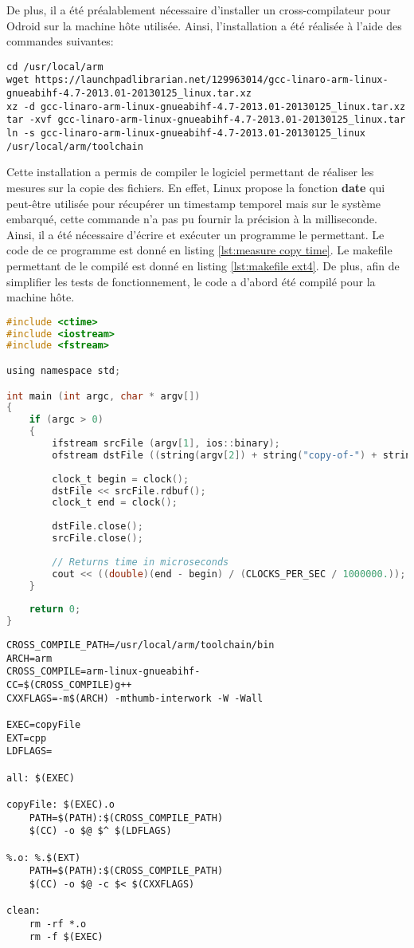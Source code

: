 De plus, il a été préalablement nécessaire d'installer un cross-compilateur pour Odroid sur la machine hôte utilisée. Ainsi, l'installation a été réalisée à l'aide des commandes suivantes:
\begin{lstlisting}[style=Bash]
cd /usr/local/arm
wget https://launchpadlibrarian.net/129963014/gcc-linaro-arm-linux-gnueabihf-4.7-2013.01-20130125_linux.tar.xz
xz -d gcc-linaro-arm-linux-gnueabihf-4.7-2013.01-20130125_linux.tar.xz 
tar -xvf gcc-linaro-arm-linux-gnueabihf-4.7-2013.01-20130125_linux.tar
ln -s gcc-linaro-arm-linux-gnueabihf-4.7-2013.01-20130125_linux /usr/local/arm/toolchain
\end{lstlisting}
Cette installation a permis de compiler le logiciel permettant de réaliser les mesures sur la copie des fichiers. En effet, Linux propose la fonction \textbf{date} qui peut-être utilisée pour récupérer un timestamp temporel mais sur le système embarqué, cette commande n'a pas pu fournir la précision à la milliseconde. Ainsi, il a été nécessaire d'écrire et exécuter un programme le permettant. Le code de ce programme est donné en listing \ref{lst:measure copy time}. Le makefile permettant de le compilé est donné en listing \ref{lst:makefile ext4}. De plus, afin de simplifier les tests de fonctionnement, le code a d'abord été compilé pour la machine hôte.
\begin{lstlisting}[language=C,caption=Mesure du temps de copie,label=lst:measure copy time]
#include <ctime>
#include <iostream>
#include <fstream>

using namespace std;

int main (int argc, char * argv[])
{
	if (argc > 0)
	{
		ifstream srcFile (argv[1], ios::binary);
		ofstream dstFile ((string(argv[2]) + string("copy-of-") + string(argv[1])).c_str(), ios::binary);
		
		clock_t	begin = clock();
		dstFile << srcFile.rdbuf();
		clock_t	end = clock();
		
		dstFile.close();
		srcFile.close();
		
		// Returns time in microseconds
		cout << ((double)(end - begin) / (CLOCKS_PER_SEC / 1000000.));
	}
	
	return 0;
}
\end{lstlisting}
\begin{lstlisting}[label=lst:makefile ext4,caption=makefile permettant la compilation pour la cible]
CROSS_COMPILE_PATH=/usr/local/arm/toolchain/bin
ARCH=arm
CROSS_COMPILE=arm-linux-gnueabihf-
CC=$(CROSS_COMPILE)g++
CXXFLAGS=-m$(ARCH) -mthumb-interwork -W -Wall

EXEC=copyFile
EXT=cpp
LDFLAGS=

all: $(EXEC)

copyFile: $(EXEC).o 
	PATH=$(PATH):$(CROSS_COMPILE_PATH)
	$(CC) -o $@ $^ $(LDFLAGS)

%.o: %.$(EXT)
	PATH=$(PATH):$(CROSS_COMPILE_PATH)
	$(CC) -o $@ -c $< $(CXXFLAGS)

clean:
	rm -rf *.o
	rm -f $(EXEC)
\end{lstlisting}

